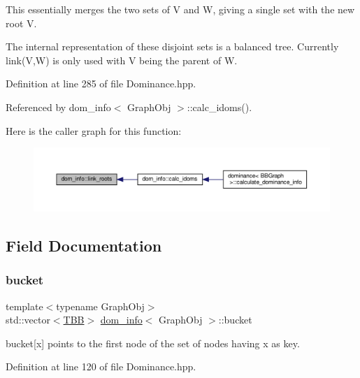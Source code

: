 This essentially merges the two sets of V and W, giving a single set with the new root V. 

The internal representation of these disjoint sets is a balanced tree. Currently link(\+V,\+W) is only used with V being the parent of W. 

Definition at line 285 of file Dominance.\+hpp.



Referenced by dom\+\_\+info$<$ Graph\+Obj $>$\+::calc\+\_\+idoms().

Here is the caller graph for this function\+:
\nopagebreak
\begin{figure}[H]
\begin{center}
\leavevmode
\includegraphics[width=350pt]{d3/dea/classdom__info_a6cd51fb7e9240c93d7f254b2a5e5b36a_icgraph}
\end{center}
\end{figure}


\subsection{Field Documentation}
\mbox{\label{classdom__info_ac12a7da04724cb23285b00eda2751aaf}} 
\subsubsection{\texorpdfstring{bucket}{bucket}}
{\footnotesize\ttfamily template$<$typename Graph\+Obj$>$ \\
std\+::vector$<$\hyperlink{Dominance_8hpp_ac35ffd4ddeccae8225d6ec6f55d65a97}{T\+BB}$>$ \hyperlink{classdom__info}{dom\+\_\+info}$<$ Graph\+Obj $>$\+::bucket\hspace{0.3cm}{\ttfamily [private]}}



bucket\mbox{[}x\mbox{]} points to the first node of the set of nodes having x as key. 



Definition at line 120 of file Dominance.\+hpp.

\mbox{\label{classdom__info_a96e7f51bbd82708f40ca4d783bcbb5de}} 
